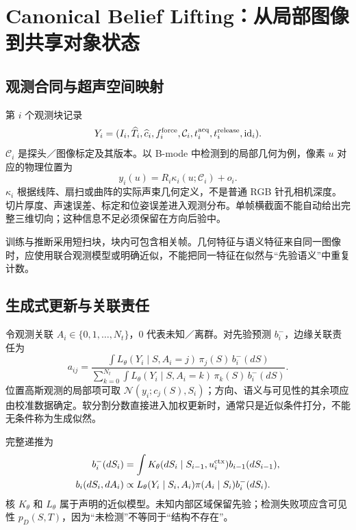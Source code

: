 \documentclass[UTF8,fontset=fandol,11pt,a4paper]{ctexart}
\theoremstyle{plain}
\theoremstyle{definition}
\theoremstyle{remark}
\numberwithin{equation}{section}
\begin{document}
\section{Canonical Belief Lifting：从局部图像到共享对象状态}
\label{sec:lift}
\subsection{观测合同与超声空间映射}
第 $i$ 个观测块记录
\begin{equation}
 Y_i=(I_i,\widehat T_i,\widehat c_i,f_i^{\rm force},\mathcal C_i,t_i^{\rm acq},t_i^{\rm release},\mathrm{id}_i).
 \label{eq:obs}
\end{equation}
$\mathcal C_i$ 是探头／图像标定及其版本。以 B-mode 中检测到的局部几何为例，像素 $u$ 对应的物理位置为
\begin{equation}
 y_i(u)=R_i\kappa_i(u;\mathcal C_i)+o_i.
 \label{eq:pixel}
\end{equation}
$\kappa_i$ 根据线阵、扇扫或曲阵的实际声束几何定义，不是普通 RGB 针孔相机深度。切片厚度、声速误差、标定和位姿误差进入观测分布。单帧横截面不能自动给出完整三维切向；这种信息不足必须保留在方向后验中。

训练与推断采用短扫块，块内可包含相关帧。几何特征与语义特征来自同一图像时，应使用联合观测模型或明确近似，不能把同一特征在似然与“先验语义”中重复计数。

\subsection{生成式更新与关联责任}
令观测关联 $A_i\in\{0,1,\ldots,N_t\}$，$0$ 代表未知／离群。对先验预测 $b_i^-$，边缘关联责任为
\begin{equation}
 a_{ij}=\frac{
 \int L_\theta(Y_i\mid S,A_i=j)\,\pi_j(S)\,b_i^-(dS)
 }{\sum_{k=0}^{N_t}\int L_\theta(Y_i\mid S,A_i=k)\,\pi_k(S)\,b_i^-(dS)}.
 \label{eq:association}
\end{equation}
位置高斯观测的局部项可取 $\mathcal N(y_i;c_j(S),S_i)$；方向、语义与可见性的其余项应由校准数据确定。软分割分数直接进入加权更新时，通常只是近似条件打分，不能无条件称为生成似然。

完整递推为
\begin{align}
 b_i^-(dS_i)&=\int K_\theta(dS_i\mid S_{i-1},u_i^{\rm ctx})b_{i-1}(dS_{i-1}),\\
 b_i(dS_i,dA_i)&\propto L_\theta(Y_i\mid S_i,A_i)\pi(A_i\mid S_i)b_i^-(dS_i).
 \label{eq:bayes}
\end{align}
核 $K_\theta$ 和 $L_\theta$ 属于声明的近似模型。未知内部区域保留先验；检测失败项应含可见性 $p_D(S,T)$，因为“未检测”不等同于“结构不存在”。
\end{document}
